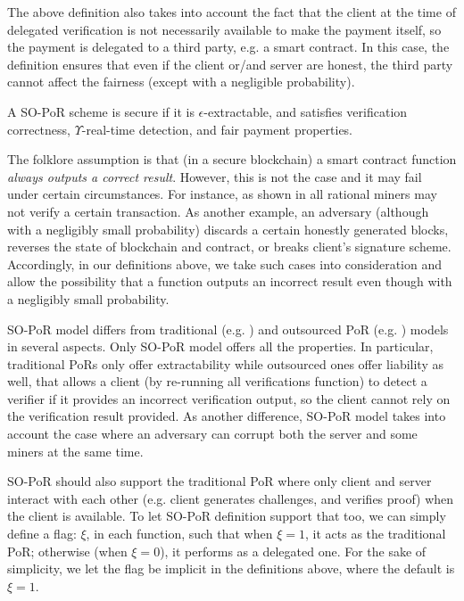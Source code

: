 The above definition also takes into account the fact that the client at the time of delegated verification is not necessarily available to make the payment itself, so the payment is delegated to a third party, e.g. a smart contract. In this case, the definition  ensures that even if  the client or/and server are honest, the third party cannot affect  the fairness (except with a negligible probability).


\begin{definition}\label{SO-PoR-Security} A SO-PoR scheme is secure if it is $\epsilon$-extractable, and satisfies verification correctness, $\Upsilon$-real-time detection, and fair payment properties.

\end{definition}




\begin{remark}
The folklore assumption is that (in a secure blockchain) a smart contract function \emph{always outputs a correct result}. However, this is not the case and it may fail under certain circumstances.  For instance, as shown in \cite{LuuTKS15} all rational  miners may not verify a certain transaction. As another example,  an adversary (although with a negligibly small probability)  discards a  certain honestly generated blocks,  reverses the state of blockchain and contract, or breaks client's signature scheme.  Accordingly, in our definitions above, we take such cases  into consideration and allow the possibility that a function outputs an incorrect result even though with a negligibly small probability. 
\end{remark}




\begin{remark}
SO-PoR model differs from traditional (e.g. \cite{DBLP:conf/ccs/JuelsK07,DBLP:conf/asiacrypt/ShachamW08}) and outsourced PoR  (e.g. \cite{armknecht2014outsourced,xu2016lightweight}) models in several aspects. Only  SO-PoR model offers all the properties. In particular,  traditional PoRs only offer extractability while outsourced ones  offer liability as well, that allows a client (by re-running all verifications function) to detect a verifier if it provides an incorrect verification output, so the client   cannot rely on the verification result provided.  As another difference,  SO-PoR model  takes into account the case where an adversary can corrupt both the server and some miners at the same time.
\end{remark}

\begin{remark}
SO-PoR should also support  the traditional PoR where only client and server interact with each other  (e.g. client generates challenges, and verifies proof) when the client is available. To let SO-PoR definition support that too, we can simply define a flag: $\xi$, in each function, such that  when $\xi=1$, it acts as the traditional PoR; otherwise (when $\xi=0$), it performs as a delegated one. For the sake of simplicity, we let the flag  be implicit in the definitions above, where the default  is  $\xi=1$. 
\end{remark}
